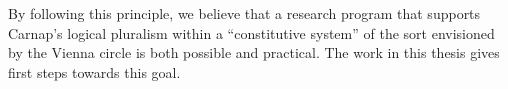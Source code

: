 By following this principle, we believe that a research program that supports Carnap's logical pluralism within a ``constitutive system'' of the sort envisioned by the Vienna circle is both possible and practical. The work in this thesis gives first steps towards this goal.




